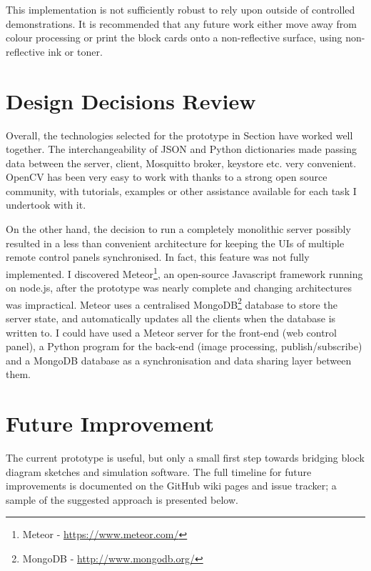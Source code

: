 This implementation is not sufficiently robust to rely upon outside of controlled demonstrations. It is recommended that any future work either move away from colour processing or print the block cards onto a non-reflective surface, using non-reflective ink or toner.

\section{Design Decisions Review}
\label{ch:review:design}

Overall, the technologies selected for the prototype in Section \label{sec:techSelection} have worked well together. The interchangeability of JSON and Python dictionaries made passing data between the server, client, Mosquitto broker, keystore etc. very convenient. OpenCV has been very easy to work with thanks to a strong open source community, with tutorials, examples or other assistance available for each task I undertook with it.

On the other hand, the decision to run a completely monolithic server possibly resulted in a less than convenient architecture for keeping the UIs of multiple remote control panels synchronised. In fact, this feature was not fully implemented. I discovered Meteor\footnote{Meteor - \url{https://www.meteor.com/}}, an open-source Javascript framework running on node.js, after the prototype was nearly complete and changing architectures was impractical. Meteor uses a centralised MongoDB\footnote{MongoDB - \url{http://www.mongodb.org/}} database to store the server state, and automatically updates all the clients when the database is written to. I could have used a Meteor server for the front-end (web control panel), a Python program for the back-end (image processing, publish/subscribe) and a MongoDB database as a synchronisation and data sharing layer between them.

\section{Future Improvement}

The current prototype is useful, but only a small first step towards bridging block diagram sketches and simulation software. The full timeline for future improvements is documented on the GitHub wiki pages and issue tracker; a sample of the suggested approach is presented below.

